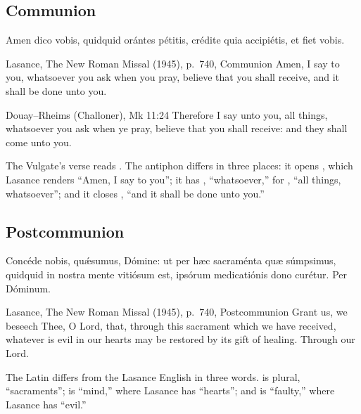 \subsection{Communion}
\label{proper-communion}


\begin{latinproper}
Amen dico vobis, quidquid orántes pétitis, crédite quia accipiétis, et fiet
vobis.
\end{latinproper}

\begin{englishwitness}{Lasance, The New Roman Missal (1945), p.~740, Communion}
Amen, I say to you, whatsoever you ask when you pray, believe that you shall
receive, and it shall be done unto you.
\end{englishwitness}

\begin{englishwitness}{Douay--Rheims (Challoner), Mk 11:24}
Therefore I say unto you, all things, whatsoever you ask when ye pray, believe
that you shall receive: and they shall come unto you.
\end{englishwitness}

\noindent The Vulgate's verse reads . The
antiphon differs in three places: it opens , which
Lasance renders ``Amen, I say to you''; it has ,
``whatsoever,'' for , ``all things, whatsoever''; and
it closes , ``and it shall be done unto you.''

\subsection{Postcommunion}
\label{proper-postcommunion}


\begin{latinproper}
Concéde nobis, quǽsumus, Dómine: ut per hæc sacraménta quæ súmpsimus,
quidquid in nostra mente vitiósum est, ipsórum medicatiónis dono curétur. Per
Dóminum.
\end{latinproper}

\begin{englishwitness}{Lasance, The New Roman Missal (1945), p.~740, Postcommunion}
Grant us, we beseech Thee, O Lord, that, through this sacrament which we have
received, whatever is evil in our hearts may be restored by its gift of
healing. Through our Lord.
\end{englishwitness}

\noindent The Latin differs from the Lasance English in three words.
 is plural, ``sacraments'';  is ``mind,'' where
Lasance has ``hearts''; and  is ``faulty,'' where Lasance has
``evil.''
